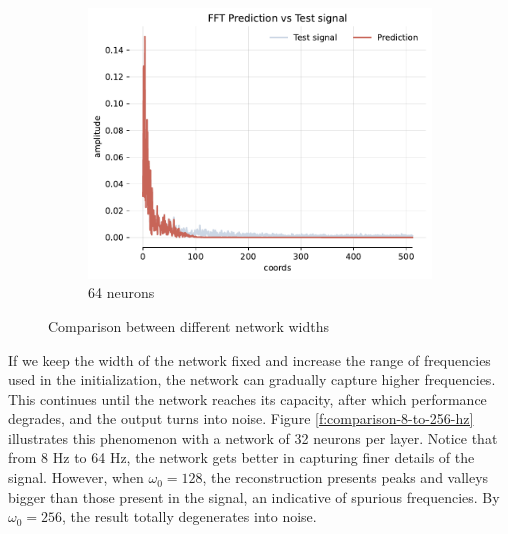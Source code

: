 \begin{figure}[!h]
\begin{subfigure}[b]{0.32\textwidth}
        \centering
        \includegraphics[width=\textwidth]{img/ch3/fft-noise-1hl-64hf-w8.pdf}
        \caption{64 neurons}
        \label{fig:fft-noise-1hl-64hf-w8}
    \end{subfigure}
    \caption{Comparison between different network widths}
    \label{f:comparison-16-32-64-hf}
\end{figure}

If we keep the width of the network fixed and increase the range of frequencies used in the initialization, the network can gradually capture higher frequencies. This continues until the network reaches its capacity, after which performance degrades, and the output turns into noise. Figure \ref{f:comparison-8-to-256-hz} illustrates this phenomenon with a network of 32 neurons per layer. Notice that from 8 Hz to 64 Hz, the network gets better in capturing finer details of the signal. However, when $\omega_0=128$, the reconstruction presents peaks and valleys bigger than those present in the signal, an indicative of spurious frequencies. By $\omega_0=256$, the result totally degenerates into noise.

